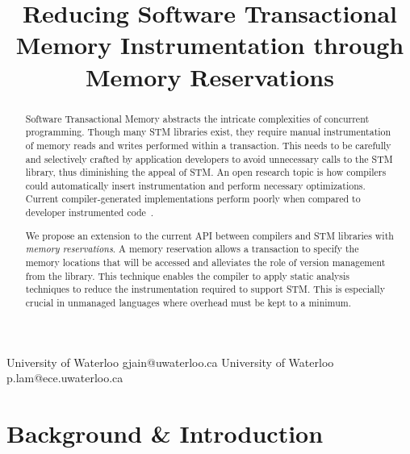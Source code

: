 \documentclass[preprint]{sigplanconf}
\begin{document}
\lstset{language=C++}

\copyrightdata{[to be supplied]} 


\title{Reducing Software Transactional Memory Instrumentation through Memory Reservations}

{University of Waterloo}
{gjain@uwaterloo.ca}
{University of Waterloo}
{p.lam@ece.uwaterloo.ca}

\maketitle

\begin{abstract}

Software Transactional Memory abstracts the intricate complexities of concurrent programming. Though many STM libraries exist, they require manual instrumentation of memory reads and writes performed within a transaction. This needs to be carefully and selectively crafted by application developers to avoid unnecessary calls to the STM library, thus diminishing the appeal of STM. An open research topic is how compilers could automatically insert instrumentation and perform necessary optimizations. Current compiler-generated implementations perform poorly when compared to developer instrumented code~\cite{Cascaval:2008:STM:1454456.1454466}.

We propose an extension to the current API between compilers and STM libraries with \emph{memory reservations}. A memory reservation allows a transaction to specify the memory locations that will be accessed and alleviates the role of version management from the library. This technique enables the compiler to apply static analysis techniques to reduce the instrumentation required to support STM. This is especially crucial in unmanaged languages where overhead must be kept to a minimum.

\end{abstract}

\section{Background \& Introduction}
\end{document}
